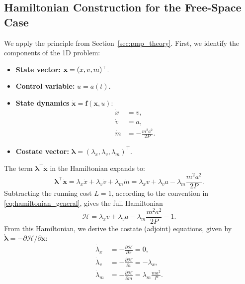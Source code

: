 \documentclass[journal,a4paper]{IEEEtran}
\begin{document}
\subsection{Hamiltonian Construction for the Free-Space Case}
We apply the principle from Section~\ref{sec:pmp_theory}. First, we identify the components of the 1D problem:
\begin{itemize}
    \item \textbf{State vector:} ${\bf x} = (x, v, m)^\top$.
    \item \textbf{Control variable:} $u = a(t)$.
    \item \textbf{State dynamics} $\dot{\mathbf{x}} = \mathbf{f}(\mathbf{x}, u)$:
    \begin{align}
      \dot x &= v, \label{eq:state_x_free}\\
      \dot v &= a, \label{eq:state_v_free}\\
      \dot m &= -\frac{m^{2}a^{2}}{2P}. \label{eq:state_m_free}
    \end{align}
    \item \textbf{Costate vector:} $\boldsymbol{\lambda} = (\lambda_x, \lambda_v, \lambda_m)^\top$.
\end{itemize}
The term $\boldsymbol{\lambda}^\top \dot{\mathbf{x}}$ in the Hamiltonian expands to:
\[
    \boldsymbol{\lambda}^\top \dot{\mathbf{x}} = \lambda_x \dot{x} + \lambda_v \dot{v} + \lambda_m \dot{m} = \lambda_x v + \lambda_v a - \lambda_m \frac{m^2 a^2}{2P}.
\]
Subtracting the running cost \(L=1\), according to the convention in \eqref{eq:hamiltonian_general}, gives the full Hamiltonian
\begin{equation}
    \mathcal{H}
    =
    \lambda_x v + \lambda_v a
    - \lambda_m \frac{m^2 a^2}{2P}
    - 1 .
    \label{eq:hamiltonian_free}
\end{equation}
From this Hamiltonian, we derive the costate (adjoint) equations, given by $\dot{\boldsymbol{\lambda}} = -\partial\mathcal{H}/\partial\mathbf{x}$:
\begin{subequations} \label{eq:costate_free}
\begin{align}
  \dot\lambda_x &= -\frac{\partial\mathcal{H}}{\partial x} = 0, \label{eq:costate_x_free}\\
  \dot\lambda_v &= -\frac{\partial\mathcal{H}}{\partial v} = -\lambda_x, \label{eq:costate_v_free}\\
  \dot\lambda_m &= -\frac{\partial\mathcal{H}}{\partial m} = \lambda_m \frac{m a^2}{P}. \label{eq:costate_m_free}
\end{align}
\end{subequations}
\end{document}
